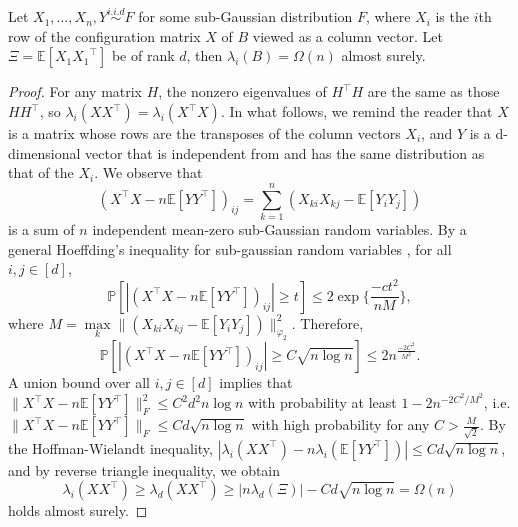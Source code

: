 \begin{lemma}
\label{appthm7}
  Let $X_1, \ldots, X_n, Y \stackrel{i.i.d}{\sim} F$ for some sub-Gaussian distribution $F$, where $X_i$ is the $i$th row of the configuration matrix $X$ of $B$ viewed as a column vector. Let $\Xi = \mathbb{E}[X_1 {X_1}^\top]$ be of rank $d$, then $\lambda_i(B) = \Omega(n)$ almost surely.
\end{lemma}
\begin{proof}
  For any matrix $H$, the nonzero eigenvalues of $H^\top H$ are the same as those $HH^\top $, so $\lambda_i(XX^\top) = \lambda_i(X^\top X)$. In what follows, we remind the reader that $X$ is a matrix whose rows are the transposes of the column vectors $X_i$, and $Y$ is a d-dimensional vector that is independent from and has the same distribution as that of the $X_i$.
  We observe that 
  $$(X^\top X - n \mathbb{E}[YY^\top] )_{ij} = \sum\limits_{k=1}^{n} (X_{ki}X_{kj} - \mathbb{E}[Y_iY_j])$$
   is a sum of $n$ independent mean-zero sub-Gaussian random variables.
By a general Hoeffding's inequality for sub-gaussian random variables \citep{HDP}, for all $i, j \in [d]$, 
$$\mathbb{P}[|(X^\top X - n\mathbb{E}[YY^\top])_{ij}|  \geq t]  \leq 2 \exp\{ \frac{-ct^2}{nM} \},$$  where $M = \max\limits_{k} 
\|(X_{ki}X_{kj} - \mathbb{E}[Y_iY_j] )\|_{\varphi_2}^2$. Therefore,
$$ \mathbb{P}[|(X^\top X - n\mathbb{E}[YY^\top])_{ij}| \geq C\sqrt{n\log n}]  \leq 2 n^{\frac{-2C^2}{M^2}}.$$
A union bound over all $i, j \in [d]$ implies that $\|X^\top X - n\mathbb{E}[YY^\top ]\|_{F}^2 \leq C^2 d^2 n \log n$ with probability at least 
$1 - 2 n^{-2C^2/M^2}$, i.e. $\|X^\top X - n\mathbb{E}[YY^\top ] \|_{F} \leq C d \sqrt{n \log n }$ with high probability for any $C > \frac{M}{\sqrt{2}}.$
By the Hoffman-Wielandt inequality, $|\lambda_i(XX^\top) - n \lambda_i(\mathbb{E}[YY^\top ])| \leq C d \sqrt{n \log n}$, and by reverse triangle inequality, we obtain $$\lambda_i(XX^\top ) \geq \lambda_d(XX^\top) \geq | n \lambda_d(\Xi) | - C d \sqrt{n \log n} = \Omega(n)$$ holds almost surely.
\end{proof}

